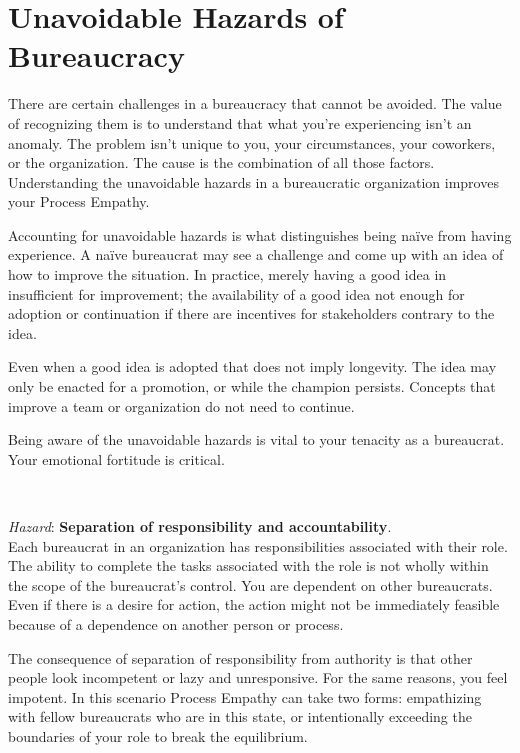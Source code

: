 \section{Unavoidable Hazards of Bureaucracy\label{sec:unavoidable-hazards}}



There are certain challenges in a bureaucracy that cannot be avoided. The value of recognizing them is to understand that what you're experiencing isn't an anomaly. The problem isn't unique to you, your circumstances, your coworkers, or the organization. The cause is the combination of all those factors.
Understanding the unavoidable hazards in a bureaucratic organization improves your Process Empathy. 

Accounting for unavoidable hazards is what distinguishes being na\"ive from having experience. A na\"ive bureaucrat may see a challenge and come up with an idea of how to improve the situation. In practice, merely having a good idea in insufficient for improvement; the availability of a good idea not enough for adoption or continuation if there are incentives for stakeholders contrary to the idea. 

Even when a good idea is adopted that does not imply longevity. The idea may only be enacted for a promotion, or while the champion persists. Concepts that improve a team or organization do not need to continue. 

Being aware of the unavoidable hazards is vital to your tenacity as a bureaucrat. Your emotional fortitude is critical. 


\ \\
\begin{samepage}
\textit{Hazard}: \textbf{Separation of responsibility and accountability}. \\
Each bureaucrat in an organization has responsibilities associated with their role. The ability to complete the tasks associated with the role is not wholly within the scope of the bureaucrat's control. You are dependent on other bureaucrats. Even if there is a desire for action, the action might not be immediately feasible because of a dependence on another person or process. 

The consequence of separation of responsibility from authority is that other people look incompetent or lazy and unresponsive. For the same reasons, you feel impotent. In this scenario Process Empathy can take two forms: empathizing with fellow bureaucrats who are in this state, or intentionally exceeding the boundaries of your role to break the equilibrium. 
\end{samepage}

